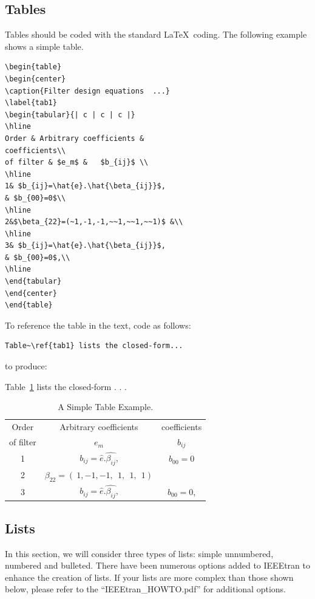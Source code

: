 \documentclass[lettersize,journal]{IEEEtran}
\begin{document}
\subsection{Tables}
\noindent Tables should be coded with the standard \LaTeX\ coding. The following example shows a simple table.


\begin{verbatim}
\begin{table}
\begin{center}
\caption{Filter design equations  ...}
\label{tab1}
\begin{tabular}{| c | c | c |}
\hline
Order & Arbitrary coefficients & 
coefficients\\
of filter & $e_m$ &   $b_{ij}$ \\
\hline
1& $b_{ij}=\hat{e}.\hat{\beta_{ij}}$, 
& $b_{00}=0$\\
\hline
2&$\beta_{22}=(~1,-1,-1,~~1,~~1,~~1)$ &\\ 
\hline
3& $b_{ij}=\hat{e}.\hat{\beta_{ij}}$, 
& $b_{00}=0$,\\
\hline 
\end{tabular}
\end{center}
\end{table}
\end{verbatim}
To reference the table in the text, code as follows:
\begin{verbatim}Table~\ref{tab1} lists the closed-form...\end{verbatim}
to produce:

Table~\ref{tab1} lists the closed-form . . .


\begin{table}
\begin{center}
\caption{A Simple Table Example.}
\label{tab1}
\begin{tabular}{| c | c | c |}
\hline
Order & Arbitrary coefficients & coefficients\\
of filter & $e_m$ &   $b_{ij}$ \\
\hline
1& $b_{ij}=\hat{e}.\hat{\beta_{ij}}$, & $b_{00}=0$\\
\hline
2&$\beta_{22}=(~1,-1,-1,~~1,~~1,~~1)$ &\\ 
\hline
3& $b_{ij}=\hat{e}.\hat{\beta_{ij}}$, & $b_{00}=0$,\\
\hline 
\end{tabular}
\end{center}
\end{table}


\subsection{Lists}
\noindent In this section, we will consider three types of lists: simple unnumbered, numbered and bulleted. There have been numerous options added to IEEEtran to enhance the creation of lists. If your lists are more complex than those shown below, please refer to the  ``IEEEtran\_HOWTO.pdf'' for additional options.\\
\end{document}
